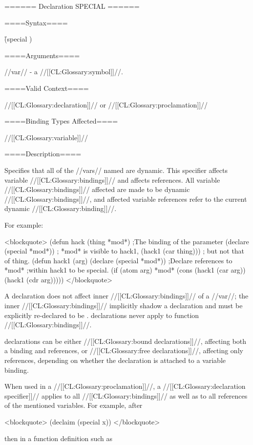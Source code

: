 ====== Declaration SPECIAL ======

====Syntax====

\f{(special )}

====Arguments====

//var// - a //[[CL:Glossary:symbol]]//.

====Valid Context====

//[[CL:Glossary:declaration]]// or //[[CL:Glossary:proclamation]]//

====Binding Types Affected====

//[[CL:Glossary:variable]]//

====Description====

Specifies that all of the //vars// named are dynamic. This specifier affects variable //[[CL:Glossary:bindings]]// and affects references. All variable //[[CL:Glossary:bindings]]// affected are made to be dynamic //[[CL:Glossary:bindings]]//, and affected variable references refer to the current dynamic //[[CL:Glossary:binding]]//.

For example:

<blockquote> (defun hack (thing *mod*) ;The binding of the parameter (declare (special *mod*)) ; *mod* is visible to hack1, (hack1 (car thing))) ; but not that of thing. (defun hack1 (arg) (declare (special *mod*)) ;Declare references to *mod* ;within hack1 to be special. (if (atom arg) *mod* (cons (hack1 (car arg)) (hack1 (cdr arg))))) </blockquote>

A  declaration does not affect inner //[[CL:Glossary:bindings]]// of a //var//; the inner //[[CL:Glossary:bindings]]// implicitly shadow a  declaration and must be explicitly re-declared to be .  declarations never apply to function //[[CL:Glossary:bindings]]//.

 declarations can be either //[[CL:Glossary:bound declarations]]//, affecting both a binding and references, or //[[CL:Glossary:free declarations]]//, affecting only references, depending on whether the declaration is attached to a variable binding.

When used in a //[[CL:Glossary:proclamation]]//, a  //[[CL:Glossary:declaration specifier]]// applies to all //[[CL:Glossary:bindings]]// as well as to all references of the mentioned variables. For example, after

<blockquote> (declaim (special x)) </blockquote>

then in a function definition such as


